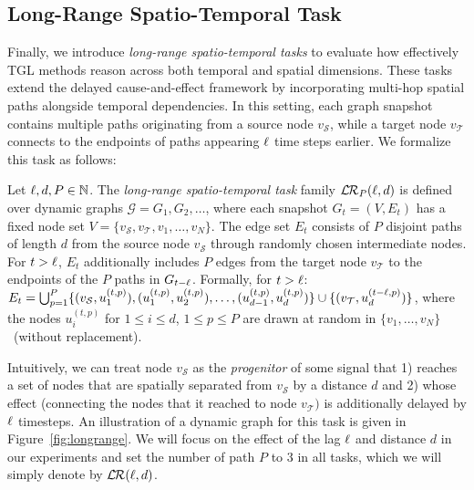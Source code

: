 \subsection{Long-Range Spatio-Temporal Task} \label{synth-benchmark:long}

  Finally, we introduce \emph{long-range spatio-temporal tasks} to evaluate how effectively TGL methods reason across both temporal and spatial dimensions. These tasks extend the delayed cause-and-effect framework by incorporating multi-hop spatial paths alongside temporal dependencies. In this setting, each graph snapshot contains multiple paths originating from a source node \(v_{\mathcal S}\), while a target node \(v_{\mathcal T}\) connects to the endpoints of paths appearing \(\ell\) time steps earlier. We formalize this task as follows:
 
\begin{definition}
 Let \(\ell, d, P \in \mathbb{N}\). The \emph{long-range spatio-temporal task} family $ \mathcal{L}\hspace{-0.035cm}\mathcal{R}_P(\lag,d)$ is defined over dynamic graphs \(\mathcal{G} = G_1, G_2, \dots\), where each snapshot $G_t = (V, E_t)$ has a fixed node set $V = \{v_{\mathcal S}, v_{\mathcal T}, v_1, \dots, v_{N}\}$. The edge set $E_t$ consists of $P$ disjoint paths of length $d$ from the source node $v_{\mathcal S}$ through randomly chosen intermediate nodes. For $t > \ell$, $E_t$ additionally includes $P$ edges from the target node $v_{\mathcal T}$ to the endpoints of the $P$ paths in $G_{t - \ell}$. Formally, for $t > \ell$:
$E_t = \bigcup_{p=1}^P \{(v_{\mathcal S}, u_1^{(t,p)}), (u_1^{(t,p)}, u_2^{(t,p)}),\dots, (u_{d-1}^{(t,p)}, u_d^{(t,p)})\} \cup \\ \{(v_{\mathcal T}, u_d^{(t-\ell,p)})\}$, where the nodes $u^{(t,p)}_{i}$ for $1\leq i\leq d$, $1\leq p \leq P$ are drawn at random in $\{v_1,\dots,v_N\}$~(without replacement).
\end{definition}\label{def:long_range}


Intuitively, we can treat node $v_\mathcal{S}$ as the \textit{progenitor} of some signal that 1) reaches a set of nodes that are spatially separated from $v_\mathcal{S}$ by a distance $d$ and 2) whose effect (connecting the nodes that it reached to node $v_\mathcal{T})$ is additionally delayed by $\ell$ timesteps.
An illustration of a dynamic graph for this task is given in Figure~\ref{fig:longrange}.
We will focus on the effect of the lag $\ell$  and distance $d$ in our experiments and set the number of path $P$ to $3$ in all tasks, which we will simply denote by $\longrange{\lag,d}$.

